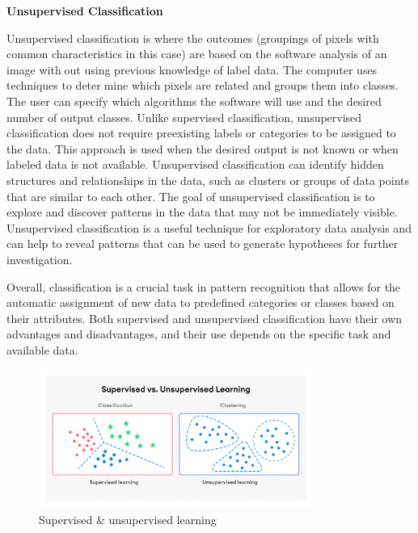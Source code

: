 \documentclass{article}
\begin{document}
{                \textbf{Unsupervised Classification}
                
                    \hspace{0.5cm}Unsupervised classification is where the outcomes (groupings of pixels with common characteristics in this case) are based on the software analysis of an image without using previous knowledge of label data. The computer uses techniques to determine which pixels are related and groups them into classes. The user can specify which algorithms the software will use and the desired number of output classes. Unlike supervised classification, unsupervised classification does not require preexisting labels or categories to be assigned to the data. This approach is used when the desired output is not known or when labeled data is not available. Unsupervised classification can identify hidden structures and relationships in the data, such as clusters or groups of data points that are similar to each other. The goal of unsupervised classification is to explore and discover patterns in the data that may not be immediately visible. Unsupervised classification is a useful technique for exploratory data analysis and can help to reveal patterns that can be used to generate hypotheses for further investigation.\cite{Alpaydin E.}
                    
                    Overall, classification is a crucial task in pattern recognition that allows for the automatic assignment of new data to predefined categories or classes based on their attributes. Both supervised and unsupervised classification have their own advantages and disadvantages, and their use depends on the specific task and available data.
                    
                    \begin{figure}[h]
                        \centering
                        \includegraphics[width=0.8\textwidth]{Figures/supUnsup.png}
                        \caption{Supervised \& unsupervised learning}
                        \label{fig:my_label}
                    \end{figure}
                    \newpage
}
\end{document}
